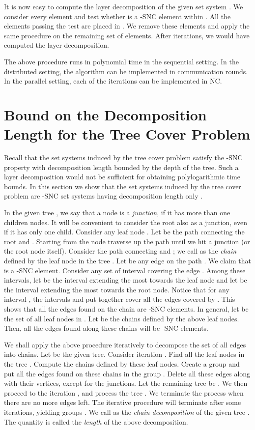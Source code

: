 \documentclass[11pt]{article}
\begin{document}
It is now easy to compute the layer decomposition of the given set system .
We consider every element  and test whether  is a -SNC element within .
All the elements passing the test are placed in .
We remove these elements and apply the same procedure on the remaining set of elements.
After  iterations, we would have computed the layer decomposition.

The above procedure runs in polynomial time in the sequential setting.
In the distributed setting, the algorithm can be implemented in  communication rounds.
In the parallel setting, each of the  iterations can be implemented in NC.

\section{Bound on the Decomposition Length for the Tree Cover Problem}
\label{sec:tree}
Recall that the set systems induced by the tree cover problem satisfy the -SNC property 
with decomposition length bounded by the depth of the tree. 
Such a layer decomposition would not be sufficient for obtaining polylogarithmic time bounds.
In this section we show that the set systems induced by the tree cover problem are -SNC set systems
having decomposition length only .

In the given tree , we say that a node  is a {\em junction}, if it has more than one children nodes.
It will be convenient to consider the root also as a junction, even if it has only one child.
Consider any leaf node . Let  be the path connecting the root and . 
Starting from the node  traverse up the path 
until we hit a junction  (or the root node itself). Consider the path  connecting  and ;
we call  as the {\em chain} defined by the leaf node  in the tree .
Let  be any edge on the path . We claim that  is a -SNC element.
Consider any set of interval  covering the edge .
Among these intervals, let  be the interval extending the most towards the leaf node 
and let  be the interval extending the most towards the root node.
Notice that for any interval , the intervals  and  put together cover
all the edges covered by . This shows that all the edges found on the chain  are -SNC elements.
In general, let  be the set of all leaf nodes in .
Let  be the chains defined by the above leaf nodes.
Then, all the edges found along these chains will be -SNC elements.

We shall apply the above procedure iteratively to decompose the set of all edges into chains.
Let  be the given tree. Consider iteration .
Find all the leaf nodes in the tree . Compute the chains defined by these leaf nodes.
Create a group  and put all the edges found on these chains in the group .
Delete all these edges along with their vertices, except for the junctions.
Let the remaining tree be . We then proceed to the iteration ,
and process the tree . We terminate the process when there are no more edges left.
The iterative procedure will terminate after some  iterations,
yielding groups . We call 
as the {\em chain decomposition} of the given tree . The quantity  is called the
{\em length} of the above decomposition. 
\end{document}
